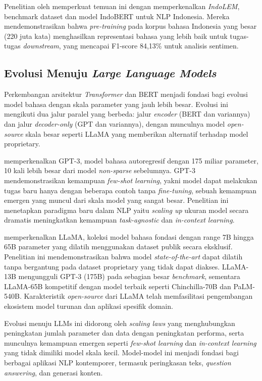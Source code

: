 Penelitian oleh \textcite{koto2020} memperkuat temuan ini dengan memperkenalkan \textit{IndoLEM}, benchmark dataset dan model IndoBERT untuk NLP Indonesia. Mereka mendemonstrasikan bahwa \textit{pre-training} pada korpus bahasa Indonesia yang besar (220 juta kata) menghasilkan representasi bahasa yang lebih baik untuk tugas-tugas \textit{downstream}, yang mencapai F1-score 84,13\% untuk analisis sentimen.

\subsection{Evolusi Menuju \textit{Large Language Models}}

Perkembangan arsitektur \textit{Transformer} dan BERT menjadi fondasi bagi evolusi model bahasa dengan skala parameter yang jauh lebih besar. Evolusi ini mengikuti dua jalur paralel yang berbeda: jalur \textit{encoder} (BERT dan variannya) dan jalur \textit{decoder-only} (GPT dan variannya), dengan munculnya model \textit{open-source} skala besar seperti LLaMA yang memberikan alternatif terhadap model proprietary.

\textcite{brown2020} memperkenalkan GPT-3, model bahasa autoregresif dengan 175 miliar parameter, 10 kali lebih besar dari model \textit{non-sparse} sebelumnya. GPT-3 mendemonstrasikan kemampuan \textit{few-shot learning}, yakni model dapat melakukan tugas baru hanya dengan beberapa contoh tanpa \textit{fine-tuning}, sebuah kemampuan emergen yang muncul dari skala model yang sangat besar. Penelitian ini menetapkan paradigma baru dalam NLP yaitu \textit{scaling up} ukuran model secara dramatis meningkatkan kemampuan \textit{task-agnostic} dan \textit{in-context learning}.

\textcite{touvron2023} memperkenalkan LLaMA, koleksi model bahasa fondasi dengan range 7B hingga 65B parameter yang dilatih menggunakan dataset publik secara eksklusif. Penelitian ini mendemonstrasikan bahwa model \textit{state-of-the-art} dapat dilatih tanpa bergantung pada dataset proprietary yang tidak dapat diakses. LLaMA-13B mengungguli GPT-3 (175B) pada sebagian besar \textit{benchmark}, sementara LLaMA-65B kompetitif dengan model terbaik seperti Chinchilla-70B dan PaLM-540B. Karakteristik \textit{open-source} dari LLaMA telah memfasilitasi pengembangan ekosistem model turunan dan aplikasi spesifik domain.

Evolusi menuju LLMs ini didorong oleh \textit{scaling laws} yang menghubungkan peningkatan jumlah parameter dan data dengan peningkatan performa, serta munculnya kemampuan emergen seperti \textit{few-shot learning} dan \textit{in-context learning} yang tidak dimiliki model skala kecil. Model-model ini menjadi fondasi bagi berbagai aplikasi NLP kontemporer, termasuk peringkasan teks, \textit{question answering}, dan generasi konten.


